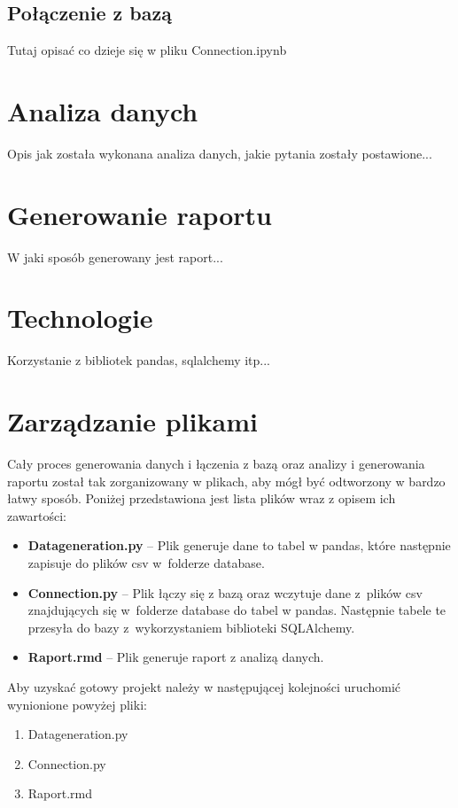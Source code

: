 \documentclass{article}
\begin{document}
	\subsection{Połączenie z bazą}
	Tutaj opisać co dzieje się w pliku Connection.ipynb
	
	
	
	
	\section{Analiza danych}
	
	Opis jak została wykonana analiza danych, jakie pytania zostały postawione...
	
	\section{Generowanie raportu}
	
	W jaki sposób generowany jest raport...
	
	\section{Technologie}
	
	Korzystanie z bibliotek pandas, sqlalchemy itp...
	
	
	
	\section{Zarządzanie plikami}
	Cały proces generowania danych i łączenia z bazą oraz analizy i generowania raportu został tak zorganizowany w plikach, aby mógł być odtworzony w bardzo łatwy sposób. Poniżej przedstawiona jest lista plików wraz z opisem ich zawartości:
	\begin{itemize}
		\setlength{\itemsep}{-2pt}
		\item \textbf{Data\textunderscore generation.py} – Plik generuje dane to tabel w pandas, które następnie zapisuje do plików csv w~folderze database.
		\item \textbf{Connection.py} – Plik łączy się z bazą oraz wczytuje dane z~plików csv znajdujących się w~folderze database do tabel w pandas.
		Następnie tabele te przesyła do bazy z~wykorzystaniem biblioteki SQLAlchemy.
		\item \textbf{Raport.rmd} – Plik generuje raport z analizą danych.	
	\end{itemize}
	
	
	\noindent Aby uzyskać gotowy projekt należy w następującej kolejności uruchomić wynionione powyżej pliki:
	\begin{enumerate}
		\setlength{\itemsep}{-2pt}
		\item Data\textunderscore generation.py
		\item Connection.py
		\item Raport.rmd
	\end{enumerate}
	
\end{document}
